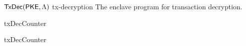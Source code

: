\begin{cccProgram}
	{$\mathsf{TxDec}(\mathsf{PKE}, \Lambda)$}
	{tx-decryption}
	{The enclave program for transaction decryption.}

	\begin{minipage}[t]{.49\textwidth}
		\begin{algorithmWithNumbering}{txDecCounter}

			\EndIf

		\end{algorithmWithNumbering}
	\end{minipage}
	\begin{minipage}[t]{.49\textwidth}
		\begin{algorithmWithNumbering}{txDecCounter}






		\end{algorithmWithNumbering}
	\end{minipage}
\end{cccProgram}
